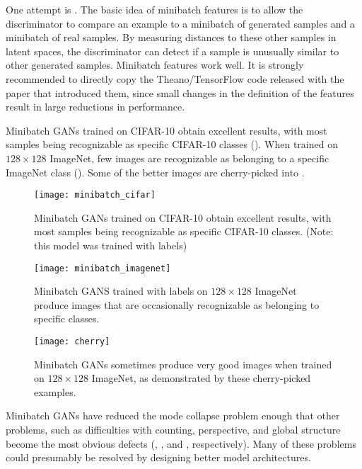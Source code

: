 One attempt is  \citep{salimans2016improved}.
The basic idea of minibatch features is to allow the discriminator to compare
an example to a minibatch of generated samples and a minibatch of real samples.
By measuring distances to these other samples in latent spaces, the discriminator
can detect if a sample is unusually similar to other generated samples.
Minibatch features work well.
It is strongly recommended to directly copy the Theano/TensorFlow code released
with the paper that introduced them, since small changes in the definition of the
features result in large reductions in performance.

Minibatch GANs trained on CIFAR-10 obtain excellent results, with most samples
being recognizable as specific CIFAR-10 classes ().
When trained on $128 \times 128$ ImageNet, few images are recognizable as belonging
to a specific ImageNet class ().
Some of the better images are cherry-picked into .

\begin{figure}
  \centering
  \texttt{[image: minibatch\_cifar]}
  \caption{
    Minibatch GANs trained on CIFAR-10 obtain excellent results, with most samples
    being recognizable as specific CIFAR-10 classes.
    (Note: this model was trained with labels)
  }
  \label{fig:minibatch_cifar}
\end{figure}

\begin{figure}
  \centering
  \texttt{[image: minibatch\_imagenet]}
  \caption{
    Minibatch GANS trained with labels on $128 \times 128$ ImageNet produce images
    that are occasionally recognizable as belonging to specific
    classes.
  }
  \label{fig:minibatch_imagenet}
\end{figure}

\begin{figure}
  \centering
  \texttt{[image: cherry]}
  \caption{
    Minibatch GANs sometimes produce very good images when trained on $128 \times 128$
    ImageNet, as demonstrated by these cherry-picked examples.
  }
  \label{fig:cherry}
\end{figure}

Minibatch GANs have reduced the mode collapse problem enough that other problems, such
as difficulties with counting, perspective, and global structure become the most obvious
defects (, , and ,
respectively).
Many of these problems could presumably be resolved by designing better model architectures.


